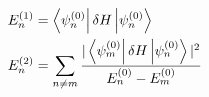 

\vspace*{\fill}
\centering

\begin{align*}
    E_{n}^{(1)} &= \bra{\psi_{n}^{(0)}} \delta H \ket{\psi_{n}^{(0)}} \\
    E_{n}^{(2)} &= \sum_{n \ne m} \frac{|\bra{\psi_{m}^{(0)}} \delta H \ket{\psi_{n}^{(0)}}|^2}{E_{n}^{(0)} - E_{m}^{(0)}}
\end{align*}

\centering
\vspace*{\fill}

